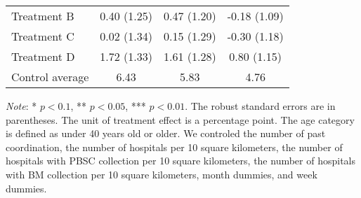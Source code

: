 \documentclass[12pt, a4paper]{article}
\begin{document}
\begin{table}[H]
\begin{threeparttable}
\begin{tabular}[t]{lccc}
\hspace{1em}Treatment B & 0.40 (1.25) & 0.47 (1.20) & -0.18 (1.09)\\
\hspace{1em}Treatment C & 0.02 (1.34) & 0.15 (1.29) & -0.30 (1.18)\\
\hspace{1em}Treatment D & 1.72 (1.33) & 1.61 (1.28) & 0.80 (1.15)\\
\hspace{1em}Control average & 6.43 & 5.83 & 4.76\\
\bottomrule
\end{tabular}
\begin{tablenotes}
\item \emph{Note}: * $p < 0.1$, ** $p < 0.05$, *** $p < 0.01$. The robust standard errors are in parentheses. The unit of treatment effect is a percentage point. The age category is defined as under 40 years old or older. We controled the number of past coordination, the number of hospitals per 10 square kilometers, the number of hospitals with PBSC collection per 10 square kilometers, the number of hospitals with BM collection per 10 square kilometers, month dummies, and week dummies.
\end{tablenotes}
\end{threeparttable}
\end{table}

\clearpage


\end{document}
